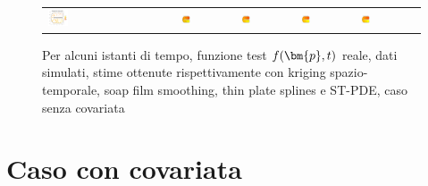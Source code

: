 \documentclass[a4paper,11pt,twoside,openright]{book}							%
\begin{document}
\begin{landscape}
\begin{figure}
\begin{tabular}{lcccccc}
\includegraphics[trim=0.8cm 0.8cm 2.5cm 1.2cm,clip=true,width=0.19\textwidth,valign=t]{Immagini/simulazioni/Dati_tempo4.png}&
\includegraphics[trim=0cm 0cm 0cm 1.8cm,clip=true,width=0.19\textwidth,valign=t]{Immagini/simulazioni/KRIGtempo4.png}&
\includegraphics[trim=0cm 0cm 0cm 1.8cm,clip=true,width=0.19\textwidth,valign=t]{Immagini/simulazioni/TPStempo4.png}&
\includegraphics[trim=0cm 0cm 0cm 1.8cm,clip=true,width=0.19\textwidth,valign=t]{Immagini/simulazioni/SOAPtempo4.png}&
\includegraphics[trim=0cm 0cm 0cm 1.8cm,clip=true,width=0.19\textwidth,valign=t]{Immagini/simulazioni/STSRtempo4.png}

\end{tabular}
\caption{Per alcuni istanti di tempo, funzione test $f(\protect\bm{p},t)$ reale, dati simulati, stime ottenute rispettivamente con kriging spazio-temporale, soap film smoothing, thin plate splines e ST-PDE, caso senza covariata}
\label{fig:confronto_altri_metodi_nocov}
\end{figure}
\end{landscape}

\section{Caso con covariata}
\end{document}
